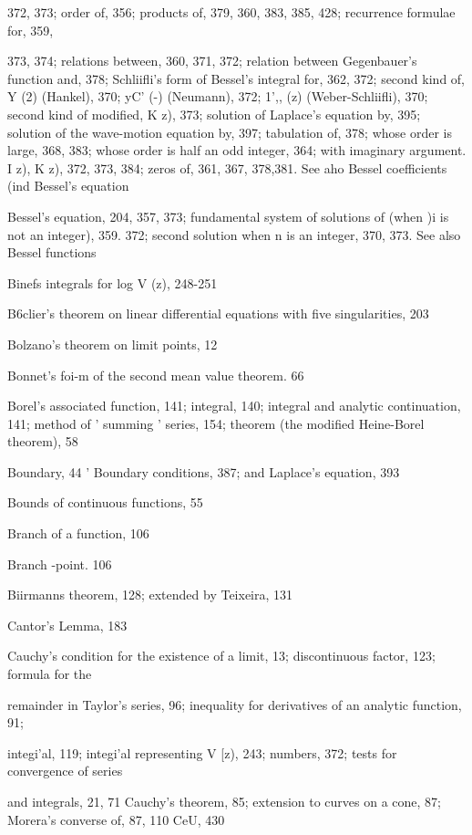 372, 373; order of, 356; products of, 379, 360, 383, 385, 428; recurrence formulae for, 359,

373, 374; relations between, 360, 371, 372; relation between Gegenbauer's function and,
378; Schliifli's form of Bessel's integral for, 362, 372; second kind of, Y (2) (Hankel), 370;
yC' (-) (Neumann), 372; 1',, (z) (Weber-Schliifli), 370; second kind of modified, K  z), 373;
solution of Laplace's equation by, 395; solution of the wave-motion equation by, 397;
tabulation of, 378; whose order is large, 368, 383; whose order is half an odd integer, 364;
with imaginary argument. I  z), K  z), 372, 373, 384; zeros of, 361, 367, 378,381. See
aho Bessel coefficients (ind Bessel's equation

Bessel's equation, 204, 357, 373; fundamental system of solutions of (when )i is not an integer),
359. 372; second solution when n is an integer, 370, 373. See also Bessel functions

Binefs integrals for log V (z), 248-251

B6clier's theorem on linear differential equations with five singularities, 203

Bolzano's theorem on limit points, 12

Bonnet's foi-m of the second mean value theorem. 66

Borel's associated function, 141; integral, 140; integral and analytic continuation, 141; method
of ' summing ' series, 154; theorem (the modified Heine-Borel theorem), 58

Boundary, 44
 ' Boundary conditions, 387; and Laplace's equation, 393

Bounds of continuous functions, 55

Branch of a function, 106

Branch -point. 106

Biirmanns theorem, 128; extended by Teixeira, 131

Cantor's Lemma, 183

Cauchy's condition for the existence of a limit, 13; discontinuous factor, 123; formula for the

remainder in Taylor's series, 96; inequality for derivatives of an analytic function, 91;

integi'al, 119; integi'al representing V [z), 243; numbers, 372; tests for convergence of series

and integrals, 21, 71
Cauchy's theorem, 85; extension to curves on a cone, 87; Morera's converse of, 87, 110
CeU, 430


